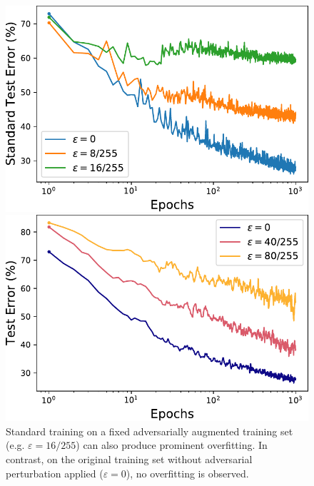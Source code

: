 \begin{figure}
    \centering
    \begin{minipage}{0.45\textwidth}
      \centering
      \includegraphics[width=1.0\linewidth]{figures/ad_augment.pdf}
      \caption{Standard training on a fixed adversarially augmented training set (e.g. $\varepsilon = 16/255$) can also produce prominent overfitting. In contrast, on the original training set without adversarial perturbation applied ($\varepsilon=0$), no overfitting is observed. 
      }
    \label{fig:fixed-augment}
    \vspace{-2mm}
    \end{minipage}\hfill
    \begin{minipage}{0.45\textwidth}
      \centering
      \includegraphics[width=1.0\textwidth]{figures/double-descent-gaussian-noise.pdf}

\end{minipage}
\end{figure}
